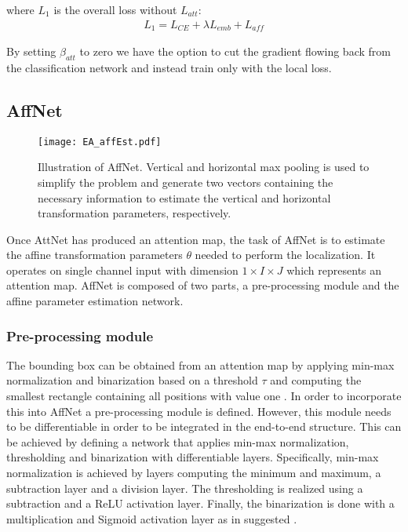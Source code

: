 \documentclass{bmvc2k}
\begin{document}
where $L_{1}$ is the overall loss without $L_{att}$:
\begin{align}
  \label{formula:E2E_tmp1}
  L_{1} = L_{CE} + \lambda L_{emb} + L_{aff}
\end{align}

By setting $\beta_{att}$ to zero we have the option to cut the gradient flowing back from the classification network and instead train only with the local loss.

\subsection{AffNet}
\label{section:AffNet}
\begin{figure}[t]
\centerline{
\texttt{[image: EA\_affEst.pdf]}
}
\caption{Illustration of AffNet. Vertical and horizontal max pooling is used to simplify the problem and generate two vectors containing the necessary information to estimate  the vertical and horizontal transformation parameters, respectively.}
\label{fig:EA_affnet}
\end{figure}

Once AttNet has produced an attention map, the task of AffNet is to estimate the affine transformation parameters $\theta$ needed to perform the localization. It operates on single channel input with dimension $1 \times I \times J$ which represents an attention map. AffNet is composed of two parts, a pre-processing module and the affine parameter estimation network.


\subsubsection{Pre-processing module}
The bounding box can be obtained from an attention map by applying min-max normalization and binarization based on a threshold $\tau$ and computing the smallest rectangle containing all positions with value one \cite{Hanselmann_2020_WACV}. In order to incorporate this into AffNet a pre-processing module is defined. However, this module needs to be differentiable in order to be integrated in the end-to-end structure. This can be achieved by defining a network that applies min-max normalization, thresholding and binarization with differentiable layers. Specifically, min-max normalization is achieved by layers computing the minimum and maximum, a subtraction layer and a division layer. The thresholding is realized using a subtraction and a ReLU activation layer. Finally, the binarization is done with a multiplication and Sigmoid activation layer as in suggested \cite{fu2017look}.
\end{document}
